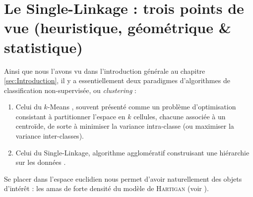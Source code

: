 
\chapter{Le Single-Linkage : trois points de vue (heuristique, géométrique \& statistique)}
\label{chap:single-linkage_trois_vues}


Ainsi que nous l'avons vu dans l'introduction générale au chapitre \ref{sec:Introduction}, il y a essentiellement deux paradigmes d'algorithmes de classification non-supervisée, ou \emph{clustering} :
\begin{enumerate}
  \item Celui du $k$-{Means} \cite{Lloyd1982}, souvent présenté comme un problème d'optimisation consistant à partitionner l'espace en $k$ cellules, chacune associée à un centroïde, de sorte à minimiser la variance intra-classe (ou maximiser la variance inter-classes).
  \item Celui du {Single-Linkage}, algorithme agglomératif construisant une hiérarchie sur les données \cite{DendriteSingleLinkage1951, GowerRoss1969}.
\end{enumerate}

Se placer dans l'espace euclidien nous permet d'avoir naturellement des objets d'intérêt : les amas de forte densité du modèle de \textsc{Hartigan} \cite{hartigan81} (voir ). 

